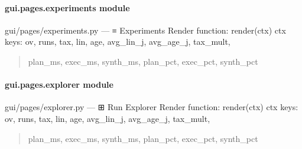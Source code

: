 \documentclass[letterpaper,10pt,english]{sphinxmanual}
\begin{document}
\begin{fulllineitems}
\label{\detokenize{gui.pages.execute:gui.pages.execute.render}}
\pysigstartsignatures
\pysiglinewithargsret
{}
{}
{}
\pysigstopsignatures
\end{fulllineitems}


\sphinxstepscope


\paragraph{gui.pages.experiments module}
\label{\detokenize{gui.pages.experiments:module-gui.pages.experiments}}\label{\detokenize{gui.pages.experiments:gui-pages-experiments-module}}\label{\detokenize{gui.pages.experiments::doc}}
\sphinxAtStartPar
gui/pages/experiments.py  —  ≡  Experiments
Render function: render(ctx)
ctx keys: ov, runs, tax, lin, age, avg\_lin\_j, avg\_age\_j, tax\_mult,
\begin{quote}

\sphinxAtStartPar
plan\_ms, exec\_ms, synth\_ms, plan\_pct, exec\_pct, synth\_pct
\end{quote}

\begin{fulllineitems}
\label{\detokenize{gui.pages.experiments:gui.pages.experiments.render}}
\pysigstartsignatures
\pysiglinewithargsret
{}
{}
{}
\pysigstopsignatures
\end{fulllineitems}


\sphinxstepscope


\paragraph{gui.pages.explorer module}
\label{\detokenize{gui.pages.explorer:module-gui.pages.explorer}}\label{\detokenize{gui.pages.explorer:gui-pages-explorer-module}}\label{\detokenize{gui.pages.explorer::doc}}
\sphinxAtStartPar
gui/pages/explorer.py  —  ⊞  Run Explorer
Render function: render(ctx)
ctx keys: ov, runs, tax, lin, age, avg\_lin\_j, avg\_age\_j, tax\_mult,
\begin{quote}

\sphinxAtStartPar
plan\_ms, exec\_ms, synth\_ms, plan\_pct, exec\_pct, synth\_pct
\end{quote}
\end{document}
